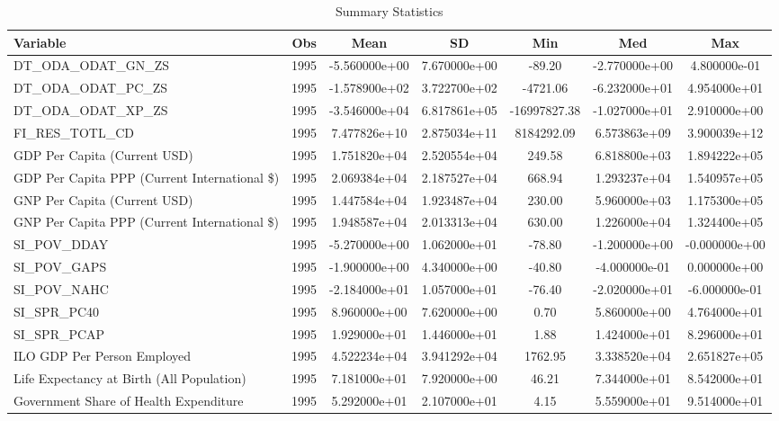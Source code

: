 \begin{table}
\centering
\caption{Summary Statistics}
\label{Sum_Stats}
\begin{tabular}{lcccccc}
\toprule
                                    Variable &  Obs &          Mean &           SD &          Min &           Med &           Max \\
\midrule
DT\_ODA\_ODAT\_GN\_ZS & 1995 & -5.560000e+00 & 7.670000e+00 & -89.20 & -2.770000e+00 & 4.800000e-01 \\
DT\_ODA\_ODAT\_PC\_ZS & 1995 & -1.578900e+02 & 3.722700e+02 & -4721.06 & -6.232000e+01 & 4.954000e+01 \\
DT\_ODA\_ODAT\_XP\_ZS & 1995 & -3.546000e+04 & 6.817861e+05 & -16997827.38 & -1.027000e+01 & 2.910000e+00 \\
FI\_RES\_TOTL\_CD & 1995 & 7.477826e+10 & 2.875034e+11 & 8184292.09 & 6.573863e+09 & 3.900039e+12 \\
GDP Per Capita (Current USD) & 1995 & 1.751820e+04 & 2.520554e+04 & 249.58 & 6.818800e+03 & 1.894222e+05 \\
GDP Per Capita PPP (Current International \$) & 1995 & 2.069384e+04 & 2.187527e+04 & 668.94 & 1.293237e+04 & 1.540957e+05 \\
GNP Per Capita (Current USD) & 1995 & 1.447584e+04 & 1.923487e+04 & 230.00 & 5.960000e+03 & 1.175300e+05 \\
GNP Per Capita PPP (Current International \$) & 1995 & 1.948587e+04 & 2.013313e+04 & 630.00 & 1.226000e+04 & 1.324400e+05 \\
SI\_POV\_DDAY & 1995 & -5.270000e+00 & 1.062000e+01 & -78.80 & -1.200000e+00 & -0.000000e+00 \\
SI\_POV\_GAPS & 1995 & -1.900000e+00 & 4.340000e+00 & -40.80 & -4.000000e-01 & 0.000000e+00 \\
SI\_POV\_NAHC & 1995 & -2.184000e+01 & 1.057000e+01 & -76.40 & -2.020000e+01 & -6.000000e-01 \\
SI\_SPR\_PC40 & 1995 & 8.960000e+00 & 7.620000e+00 & 0.70 & 5.860000e+00 & 4.764000e+01 \\
SI\_SPR\_PCAP & 1995 & 1.929000e+01 & 1.446000e+01 & 1.88 & 1.424000e+01 & 8.296000e+01 \\
ILO GDP Per Person Employed & 1995 & 4.522234e+04 & 3.941292e+04 & 1762.95 & 3.338520e+04 & 2.651827e+05 \\
Life Expectancy at Birth (All Population) & 1995 & 7.181000e+01 & 7.920000e+00 & 46.21 & 7.344000e+01 & 8.542000e+01 \\
Government Share of Health Expenditure & 1995 & 5.292000e+01 & 2.107000e+01 & 4.15 & 5.559000e+01 & 9.514000e+01 \\
\bottomrule
\end{tabular}
\end{table}
